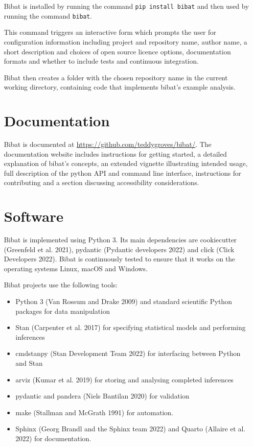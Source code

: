 \documentclass[
  letterpaper,
  DIV=11,
  numbers=noendperiod]{scrartcl}
\providecommand{\tightlist}{%
  \setlength{\itemsep}{0pt}\setlength{\parskip}{0pt}}\usepackage{longtable,booktabs,array}
\begin{document}
Bibat is installed by running the command \texttt{pip\ install\ bibat}
and then used by running the command \texttt{bibat}.

This command triggers an interactive form which prompts the user for
configuration information including project and repository name, author
name, a short description and choices of open source licence options,
documentation formats and whether to include tests and continuous
integration.

Bibat then creates a folder with the chosen repository name in the
current working directory, containing code that implements bibat's
example analysis.

\hypertarget{documentation}{%
\section{Documentation}\label{documentation}}

Bibat is documented at \url{https://github.com/teddygroves/bibat/}. The
documentation website includes instructions for getting started, a
detailed explanation of bibat's concepts, an extended vignette
illustrating intended usage, full description of the python API and
command line interface, instructions for contributing and a section
discussing accessibility considerations.

\hypertarget{software}{%
\section{Software}\label{software}}

Bibat is implemented using Python 3. Its main dependencies are
cookiecutter (Greenfeld et al. 2021), pydantic (Pydantic developers
2022) and click (Click Developers 2022). Bibat is continuously tested to
ensure that it works on the operating systems Linux, macOS and Windows.

Bibat projects use the following tools:

\begin{itemize}
\tightlist
\item
  Python 3 (Van Rossum and Drake 2009) and standard scientific Python
  packages for data manipulation
\item
  Stan (Carpenter et al. 2017) for specifying statistical models and
  performing inferences
\item
  cmdstanpy (Stan Development Team 2022) for interfacing between Python
  and Stan
\item
  arviz (Kumar et al. 2019) for storing and analysing completed
  inferences
\item
  pydantic and pandera (Niels Bantilan 2020) for validation
\item
  make (Stallman and McGrath 1991) for automation.
\item
  Sphinx (Georg Brandl and the Sphinx team 2022) and Quarto (Allaire et
  al. 2022) for documentation.
\end{itemize}
\end{document}
